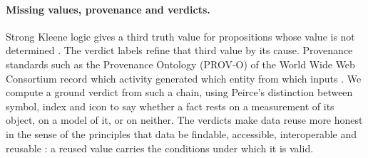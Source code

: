 \paragraph{Missing values, provenance and verdicts.}
Strong Kleene logic gives a third truth value for propositions whose value is not determined \citep{kleene1952introduction}.
The verdict labels refine that third value by its cause.
Provenance standards such as the Provenance Ontology (PROV-O) of the World Wide Web Consortium record which activity generated which entity from which inputs \citep{lebo2013provo}.
We compute a ground verdict from such a chain, using Peirce's distinction between symbol, index and icon \citep{peirce1932collected} to say whether a fact rests on a measurement of its object, on a model of it, or on neither.
The verdicts make data reuse more honest in the sense of the principles that data be findable, accessible, interoperable and reusable \citep{wilkinson2016fair}: a reused value carries the conditions under which it is valid.
